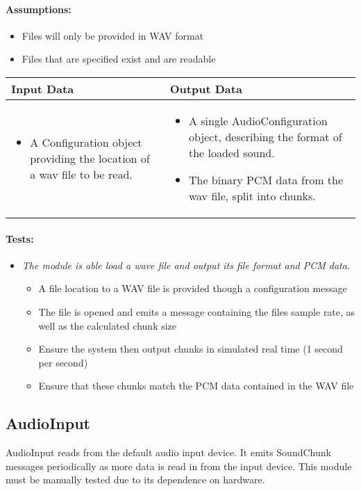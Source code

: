 \documentclass[english,12pt]{scrartcl}
\newcounter{testcounter}
\newcommand{\test}[1] {
	\stepcounter{testcounter}
	\item[] \emph{#1}.}
\begin{document}
		\paragraph{Assumptions:}
		\begin{itemize}
			\item Files will only be provided in WAV format
			\item Files that are specified exist and are readable
		\end{itemize}

		\begin{tabular}{p{7cm}|p{7cm}}
    			\textbf{Input Data} & \textbf{Output Data} \\ \hline
			\begin{itemize}
				\item A Configuration object providing the location of a wav file to be read.
			\end{itemize}
			&
			\begin{itemize}
				\item A single AudioConfiguration object, describing the format of the loaded sound.
				\item The binary PCM data from the wav file, split into chunks.
			\end{itemize}
		\end{tabular}

		\paragraph{Tests:}
		\begin{itemize}
			\test{The module is able load a wave file and output its file format and PCM data}
			\begin{itemize}
				\item A file location to a WAV file is provided though a configuration message
				\item The file is opened and emits a message containing the files sample rate, as well as the calculated chunk size
				\item Ensure the system then output chunks in simulated real time (1 second per second)
				\item Ensure that these chunks match the PCM data contained in the WAV file
			\end{itemize}
		\end{itemize}

	\subsection{AudioInput}
		AudioInput reads from the default audio input device.
		It emits SoundChunk messages periodically as more data is read in from the input device.
		This module must be manually tested due to its dependence on hardware.
\end{document}
